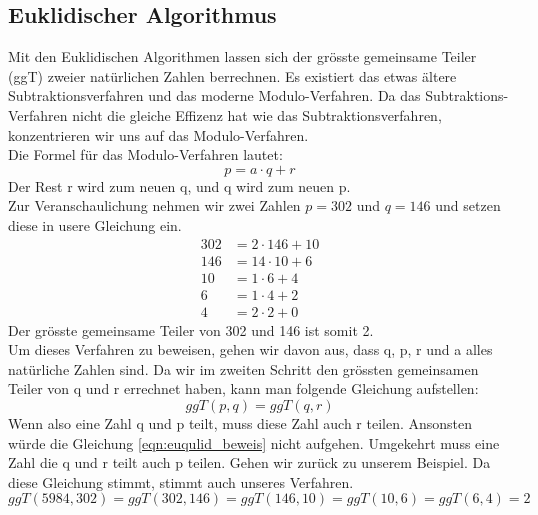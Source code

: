 \subsection{Euklidischer Algorithmus}
Mit den Euklidischen Algorithmen lassen sich der grösste gemeinsame Teiler (ggT) zweier natürlichen Zahlen berrechnen. Es existiert das etwas ältere Subtraktionsverfahren und das moderne Modulo-Verfahren. Da das Subtraktions-Verfahren nicht die gleiche Effizenz hat wie das Subtraktionsverfahren, konzentrieren wir uns auf das Modulo-Verfahren.\\
%
Die Formel für das Modulo-Verfahren lautet:
%
\begin{equation}
  \label{eqn:euklidischer_algo}
  p = a \cdot q + r
\end{equation}
%
Der Rest r wird zum neuen q, und q wird zum neuen p. \\
Zur Veranschaulichung nehmen wir zwei Zahlen $p = 302$ und $q = 146$ und setzen diese in usere Gleichung ein.
%
\begin{equation}
  \begin{split}
    302 & = 2 \cdot 146 + 10 \\
    146 & = 14 \cdot 10 + 6  \\
    10 & = 1 \cdot 6 + 4  \\
    6 & = 1 \cdot 4 + 2  \\
    4 & = 2 \cdot 2 + 0
    \label{eqn:euqulid_beweis}
  \end{split}
\end{equation}
%
Der grösste gemeinsame Teiler von 302 und 146 ist somit 2. \\[2ex]
Um dieses Verfahren zu beweisen, gehen wir davon aus, dass q, p, r und a alles natürliche Zahlen sind. Da wir im zweiten Schritt den grössten gemeinsamen Teiler von q und r errechnet haben, kann man folgende Gleichung aufstellen:
%
\begin{equation}
  ggT(p,q) = ggT(q,r)
  \label{eqn:ggT}
\end{equation}
%
Wenn also eine Zahl q und p teilt, muss diese Zahl auch r teilen. Ansonsten würde die Gleichung \ref{eqn:euqulid_beweis} nicht aufgehen. Umgekehrt muss eine Zahl die q und r teilt auch p teilen. 
Gehen wir zurück zu unserem Beispiel. Da diese Gleichung stimmt, stimmt auch unseres Verfahren.
%
\begin{equation*}
 ggT(5984,302) = ggT(302,146) = ggT(146,10) = ggT(10,6) = ggT(6,4) = 2 
\end{equation*}
%
